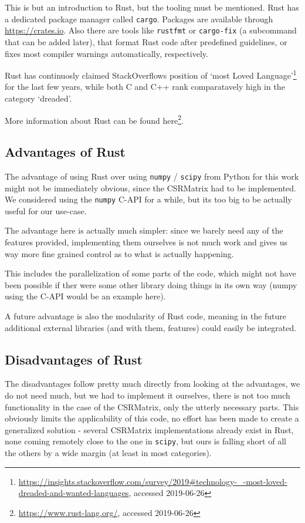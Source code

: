 
This is but an introduction to Rust, but the tooling must be mentioned. Rust
has a dedicated package manager called \verb|cargo|. Packages are available
through \url{https://crates.io}. Also there are tools like \verb|rustfmt| or
\verb|cargo-fix| (a subcommand that can be added later), that format Rust code
after predefined guidelines, or fixes most compiler warnings automatically,
respectively.

Rust has continuosly claimed StackOverflows position of `most Loved
Language'\footnote{\url{https://insights.stackoverflow.com/survey/2019\#technology-\_-most-loved-dreaded-and-wanted-languages}, accessed 2019-06-26}
for the last few years, while both C and C++ rank comparatavely high in the
category `dreaded'.

More information about Rust can be found here\footnote{\url{https://www.rust-lang.org/}, accessed 2019-06-26}.


\subsection{Advantages of Rust}

The advantage of using Rust over using \verb|numpy| / \verb|scipy| from Python
for this work might not be immediately obvious, since the CSRMatrix had to be
implemented. We considered using the \verb|numpy| C-API for a while, but its
too big to be actually useful for our use-case.

The advantage here is actually much simpler: since we barely need any of the
features provided, implementing them ourselves is not much work and gives us
way more fine grained control as to what is actually happening.

This includes the parallelization of some parts of the code, which might not
have been possible if ther were some other library doing things in its own way
(numpy using the C-API would be an example here).

A future advantage is also the modularity of Rust code, meaning in the future
additional external libraries (and with them, features) could easily be integrated.

\subsection{Disadvantages of Rust}

The disadvantages follow pretty much directly from looking at the advantages,
we do not need much, but we had to implement it ourselves, there is not
too much functionality in the case of the CSRMatrix, only the utterly necessary
parts. This obviously limits the applicability of this code, no effort has been
made to create a generalized solution - several CSRMatrix implementations
already exist in Rust, none coming remotely close to the one in \verb|scipy|,
but ours is falling short of all the others by a wide margin (at least in most
categories).



